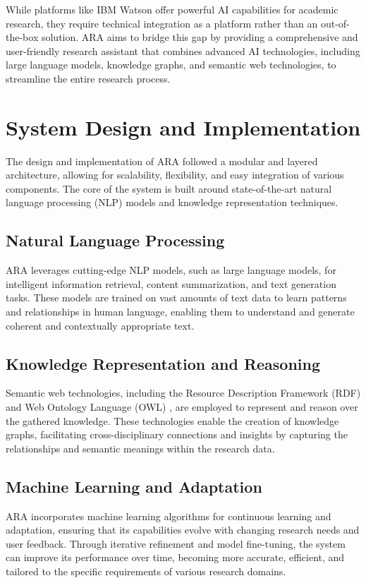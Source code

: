 \documentclass[a4paper,conference]{IEEEtran}
\begin{document}
While platforms like IBM Watson \cite{46} offer powerful AI capabilities for academic research, they require technical integration as a platform rather than an out-of-the-box solution. ARA aims to bridge this gap by providing a comprehensive and user-friendly research assistant that combines advanced AI technologies, including large language models, knowledge graphs, and semantic web technologies, to streamline the entire research process.

\section{System Design and Implementation}
The design and implementation of ARA followed a modular and layered architecture, allowing for scalability, flexibility, and easy integration of various components. The core of the system is built around state-of-the-art natural language processing (NLP) models and knowledge representation techniques.

\subsection{Natural Language Processing}
ARA leverages cutting-edge NLP models, such as large language models, for intelligent information retrieval, content summarization, and text generation tasks. These models are trained on vast amounts of text data to learn patterns and relationships in human language, enabling them to understand and generate coherent and contextually appropriate text.

\subsection{Knowledge Representation and Reasoning}
Semantic web technologies, including the Resource Description Framework (RDF) \cite{17} and Web Ontology Language (OWL) \cite{18}, are employed to represent and reason over the gathered knowledge. These technologies enable the creation of knowledge graphs, facilitating cross-disciplinary connections and insights by capturing the relationships and semantic meanings within the research data.

\subsection{Machine Learning and Adaptation}
ARA incorporates machine learning algorithms for continuous learning and adaptation, ensuring that its capabilities evolve with changing research needs and user feedback. Through iterative refinement and model fine-tuning, the system can improve its performance over time, becoming more accurate, efficient, and tailored to the specific requirements of various research domains.
\end{document}
